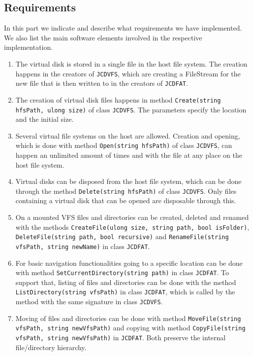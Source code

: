 \documentclass[11pt]{article}
\begin{document}
\subsection{Requirements}
In this part we indicate and describe what requirements we have implemented. We also list the main software elements involved in the respective implementation.

\begin{enumerate}
	\item The virtual disk is stored in a single file in the host file system. The creation happens in the creators of \texttt{JCDVFS}, which are creating a FileStream for the new file that is then written to in the creators of \texttt{JCDFAT}.
	\item The creation of virtual disk files happens in method \texttt{Create(string hfsPath, ulong size)} of class \texttt{JCDVFS}. The parameters specify the location and the initial size.
	\item Several virtual file systems on the host are allowed. Creation and opening, which is done with method \texttt{Open(string hfsPath)} of class \texttt{JCDVFS}, can happen an unlimited amount of times and with the file at any place on the host file system.
	\item Virtual disks can be disposed from the host file system, which can be done through the method \texttt{Delete(string hfsPath)} of class \texttt{JCDVFS}. Only files containing a virtual disk that can be opened are disposable through this.
	\item On a mounted VFS files and directories can be created, deleted and renamed with the methods \texttt{CreateFile(ulong size, string path, bool isFolder)}, \texttt{DeleteFile(string path, bool recursive)} and \texttt{RenameFile(string vfsPath, string newName)} in class \texttt{JCDFAT}.
	\item For basic navigation functionalities going to a specific location can be done with method \texttt{SetCurrentDirectory(string path)} in class \texttt{JCDFAT}. To support that, listing of files and directories can be done with the method \texttt{ListDirectory(string vfsPath)} in class \texttt{JCDFAT}, which is called by the method with the same signature in class \texttt{JCDVFS}.
	\item Moving of files and directories can be done with method \texttt{MoveFile(string vfsPath, string newVfsPath)} and copying with method \texttt{CopyFile(string vfsPath, string newVfsPath)} in \texttt{JCDFAT}. Both preserve the internal file/directory hierarchy.

\end{enumerate}
\end{document}
